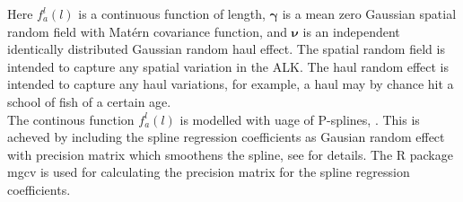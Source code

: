 \documentclass[a4paper 12pt]{article}
\numberwithin{equation}{section}
\begin{document}
Here $ f_a^l(l)$ is a continuous function of length, $\pmb{\gamma}$ is a mean zero Gaussian spatial random field with Mat\'{e}rn covariance function, and $\pmb{\nu}$ is an independent identically distributed Gaussian random haul effect. The spatial random field is intended to capture any spatial variation in the ALK. The haul random effect is intended to capture any haul variations, for example, a haul may by chance hit a school of fish of a certain age.\\  
\indent The continous function $f_a^l(l)$ is modelled with uage of P-splines, \citep{wood2017generalized}. This is acheved by including the spline regression coefficients as Gausian random effect with precision matrix which smoothens the spline, see \citet[page 239]{wood2017generalized} for details. The R package mgcv \citep{wood2015package} is used for calculating the precision matrix for the spline regression coefficients.
\end{document}
